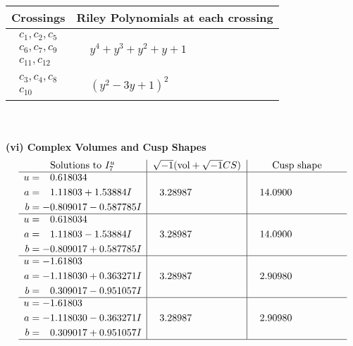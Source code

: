\documentclass[1p]{elsarticle_modified}
\theoremstyle{definition}
\newcommand{\I}{\sqrt{-1}}
\begin{document}
\begin{tabular}{m{50pt}|m{274pt}}
Crossings & \hspace{64pt}Riley Polynomials at each crossing \\
\hline $$\begin{aligned}c_{1},c_{2},c_{5}\\c_{6},c_{7},c_{9}\\c_{11},c_{12}\end{aligned}$$&$\begin{aligned}
&y^4+y^3+y^2+y+1
\end{aligned}$\\
\hline $$\begin{aligned}c_{3},c_{4},c_{8}\\c_{10}\end{aligned}$$&$\begin{aligned}
&(y^2-3 y+1)^2
\end{aligned}$\\
\hline
\end{tabular}\\~\\
\newpage\flushleft \textbf{(vi) Complex Volumes and Cusp Shapes}
$$\begin{array}{c|c|c}  
\text{Solutions to }I^u_{7}& \I (\text{vol} + \sqrt{-1}CS) & \text{Cusp shape}\\
 \hline 
\begin{aligned}
u &= \phantom{-}0.618034\phantom{ +0.000000I} \\
a &= \phantom{-}1.11803 + 1.53884 I \\
b &= -0.809017 - 0.587785 I\end{aligned}
 & \phantom{-}3.28987\phantom{ +0.000000I} & \phantom{-}14.0900\phantom{ +0.000000I} \\ \hline\begin{aligned}
u &= \phantom{-}0.618034\phantom{ +0.000000I} \\
a &= \phantom{-}1.11803 - 1.53884 I \\
b &= -0.809017 + 0.587785 I\end{aligned}
 & \phantom{-}3.28987\phantom{ +0.000000I} & \phantom{-}14.0900\phantom{ +0.000000I} \\ \hline\begin{aligned}
u &= -1.61803\phantom{ +0.000000I} \\
a &= -1.118030 + 0.363271 I \\
b &= \phantom{-}0.309017 - 0.951057 I\end{aligned}
 & \phantom{-}3.28987\phantom{ +0.000000I} & \phantom{-}2.90980\phantom{ +0.000000I} \\ \hline\begin{aligned}
u &= -1.61803\phantom{ +0.000000I} \\
a &= -1.118030 - 0.363271 I \\
b &= \phantom{-}0.309017 + 0.951057 I\end{aligned}
 & \phantom{-}3.28987\phantom{ +0.000000I} & \phantom{-}2.90980\phantom{ +0.000000I}\\
 \hline 
 \end{array}$$\newpage
\end{document}
